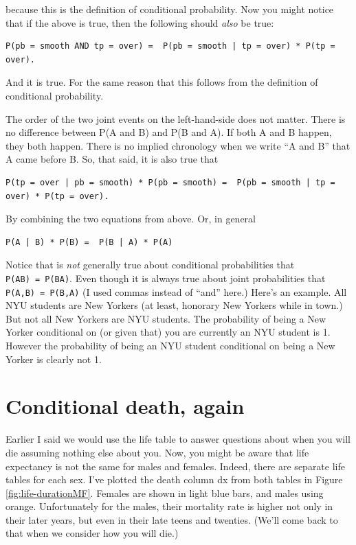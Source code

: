 \documentclass[
  openany]{book}
\begin{document}
because this is the definition of conditional probability. Now you might notice that if the above is true, then the following should \emph{also} be true:

\begin{verbatim}
P(pb = smooth AND tp = over) =  P(pb = smooth | tp = over) * P(tp = over).
\end{verbatim}

And it is true. For the same reason that this follows from the definition of conditional probability.

The order of the two joint events on the left-hand-side does not matter. There is no difference between P(A and B) and P(B and A). If both A and B happen, they both happen. There is no implied chronology when we write ``A and B'' that A came before B. So, that said, it is also true that

\begin{verbatim}
P(tp = over | pb = smooth) * P(pb = smooth) =  P(pb = smooth | tp = over) * P(tp = over).
\end{verbatim}

By combining the two equations from above. Or, in general

\begin{verbatim}
P(A | B) * P(B) =  P(B | A) * P(A)
\end{verbatim}

Notice that is \emph{not} generally true about conditional probabilities that \texttt{P(A\textbar{}B)\ =\ P(B\textbar{}A)}. Even though it is always true about joint probabilities that \texttt{P(A,B)\ =\ P(B,A)} (I used commas instead of ``and'' here.) Here's an example. All NYU students are New Yorkers (at least, honorary New Yorkers while in town.) But not all New Yorkers are NYU students. The probability of being a New Yorker conditional on (or given that) you are currently an NYU student is 1. However the probability of being an NYU student conditional on being a New Yorker is clearly not 1.

\hypertarget{conditional-death-again}{%
\section*{Conditional death, again}\label{conditional-death-again}}

Earlier I said we would use the life table to answer questions about when you will die assuming nothing else about you. Now, you might be aware that life expectancy is not the same for males and females. Indeed, there are separate life tables for each sex. I've plotted the death column dx from both tables in Figure \ref{fig:life-durationMF}. Females are shown in light blue bars, and males using orange. Unfortunately for the males, their mortality rate is higher not only in their later years, but even in their late teens and twenties. (We'll come back to that when we consider how you will die.)
\end{document}
